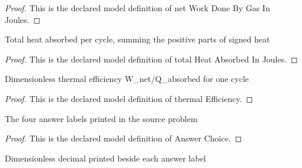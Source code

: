 \begin{proof}
  This is the declared model definition of net Work Done By Gas In Joules.
\end{proof}
\begin{definition}
  \label{def:physics:phyx-mini-0427:phyxminiproblems-problemphyxmini0427-totalheatabsorbedinjoules}
  Total heat absorbed per cycle, summing the positive parts of signed heat
\end{definition}
\begin{proof}
  This is the declared model definition of total Heat Absorbed In Joules.
\end{proof}
\begin{definition}
  \label{def:physics:phyx-mini-0427:phyxminiproblems-problemphyxmini0427-thermalefficiency}
  Dimensionless thermal efficiency W\_net/Q\_absorbed for one cycle
\end{definition}
\begin{proof}
  This is the declared model definition of thermal Efficiency.
\end{proof}
\begin{definition}
  \label{def:physics:phyx-mini-0427:phyxminiproblems-problemphyxmini0427-answerchoice}
  The four answer labels printed in the source problem
\end{definition}
\begin{proof}
  This is the declared model definition of Answer Choice.
\end{proof}
\begin{definition}
  \label{def:physics:phyx-mini-0427:phyxminiproblems-problemphyxmini0427-displayedefficiency}
  Dimensionless decimal printed beside each answer label
\end{definition}
